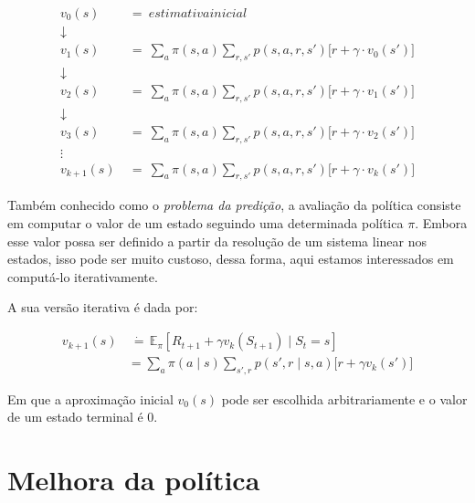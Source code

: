 \documentclass{article}
\begin{document}
            \begin{equation}
            \begin{split}
                v_0(s) & \ = \ estimativa inicial\\
                \downarrow\\
                v_1(s) & \ = \ \sum_{a} \pi(s, a) \sum_{r, s'} p(s, a, r, s') \Big[ r + \gamma \cdot v_0(s') \Big]\\
                \downarrow\\
                v_2(s) & \ = \ \sum_{a} \pi(s, a) \sum_{r, s'} p(s, a, r, s') \Big[ r + \gamma \cdot v_1(s') \Big]\\
                \downarrow\\
                v_3(s) & \ = \ \sum_{a} \pi(s, a) \sum_{r, s'} p(s, a, r, s') \Big[ r + \gamma \cdot v_2(s') \Big]\\
                \vdots\\
                v_{k+1}(s) & \ = \ \sum_{a} \pi(s, a) \sum_{r, s'} p(s, a, r, s') \Big[ r + \gamma \cdot v_k(s') \Big]
            \end{split}
            \end{equation}
    
            Também conhecido como o \textit{problema da predição}, a avaliação da política consiste em computar o valor de um estado seguindo uma determinada política $\pi$. Embora esse valor possa ser definido a partir da resolução de um sistema linear nos estados, isso pode ser muito custoso, dessa forma, aqui estamos interessados em computá-lo iterativamente.
                    
            A sua versão iterativa é dada por:
            
            \begin{equation}
                \begin{split}
                    v_{k+1}(s) & \ \dot{=} \, \mathbb{E}_{\pi} \left[ R_{t+1} + \gamma v_k(S_{t+1}) \mid S_t = s \right] \\
                    & = \sum_a \pi(a \mid s) \sum_{s',r} p(s',r \mid s,a) \Big[ r + \gamma v_k(s') \Big]
                \end{split}
            \end{equation}
            
            Em que a aproximação inicial $v_0(s)$ pode ser escolhida arbitrariamente e o valor de um estado terminal é $0$.
        
    \section{Melhora da política}
    
\end{document}
